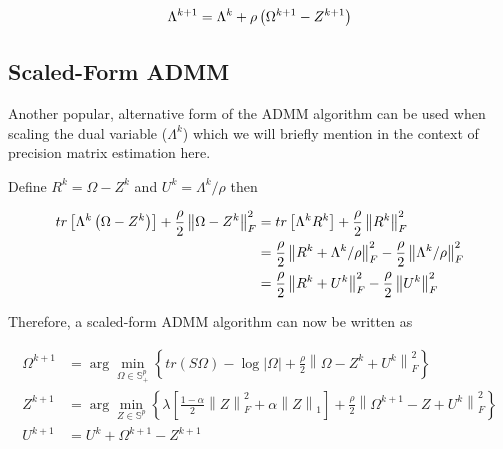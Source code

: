 \documentclass[11pt,]{report}
\theoremstyle{definition}
\theoremstyle{definition}
\theoremstyle{definition}
\theoremstyle{remark}
\begin{document}
\begin{equation}
\Lambda^{k + 1} = \Lambda^{k} + \rho\left( \Omega^{k + 1} - Z^{k + 1} \right)
\label{eq:lamalgo}\notag
\end{equation}

\hypertarget{scaled-form-admm}{%
\subsection{Scaled-Form ADMM}\label{scaled-form-admm}}

Another popular, alternative form of the ADMM algorithm can be used when scaling the dual variable (\(\Lambda^{k}\)) which we will briefly mention in the context of precision matrix estimation here.

Define \(R^{k} = \Omega - Z^{k}\) and \(U^{k} = \Lambda^{k}/\rho\) then

\begin{equation}
\begin{split}
  tr\left[ \Lambda^{k}\left( \Omega - Z^{k} \right) \right] + \frac{\rho}{2}\left\| \Omega - Z^{k} \right\|_{F}^{2} &= tr\left[ \Lambda^{k}R^{k} \right] + \frac{\rho}{2}\left\| R^{k} \right\|_{F}^{2} \\
  &= \frac{\rho}{2}\left\| R^{k} + \Lambda^{k}/\rho \right\|_{F}^{2} - \frac{\rho}{2}\left\| \Lambda^{k}/\rho \right\|_{F}^{2} \\
  &= \frac{\rho}{2}\left\| R^{k} + U^{k} \right\|_{F}^{2} - \frac{\rho}{2}\left\| U^{k} \right\|_{F}^{2}
\label{eq:scaled}\notag
\end{split}
\end{equation}

Therefore, a scaled-form ADMM algorithm can now be written as

\begin{equation}
\begin{split}
  \Omega^{k + 1} &= \arg\min_{\Omega \in \mathbb{S}_{+}^{p}}\left\{ tr\left(S\Omega\right) - \log\left|\Omega\right| + \frac{\rho}{2}\left\| \Omega - Z^{k} + U^{k} \right\|_{F}^{2} \right\} \\
  Z^{k + 1} &= \arg\min_{Z \in \mathbb{S}^{p}}\left\{ \lambda\left[ \frac{1 - \alpha}{2}\left\| Z \right\|_{F}^{2} + \alpha\left\| Z \right\|_{1} \right] + \frac{\rho}{2}\left\| \Omega^{k + 1} - Z + U^{k} \right\|_{F}^{2} \right\} \\
  U^{k + 1} &= U^{k} + \Omega^{k + 1} - Z^{k + 1}
\label{eq:ADMMscaled}
\end{split}
\end{equation}
\end{document}
